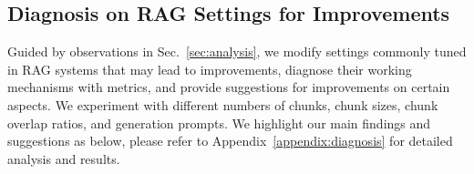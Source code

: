 



\subsection{Diagnosis on RAG Settings for Improvements}
\label{sec:diagnosis_for_imporovements}
Guided by observations in Sec.~\ref{sec:analysis}, we modify settings commonly tuned in RAG systems that may lead to improvements, diagnose their working mechanisms with \benchname\space metrics, and provide suggestions for improvements on certain aspects. We experiment with different numbers of chunks, chunk sizes, chunk overlap ratios, and generation prompts. We highlight our main findings and suggestions as below, please refer to Appendix~\ref{appendix:diagnosis} for detailed analysis and results.

